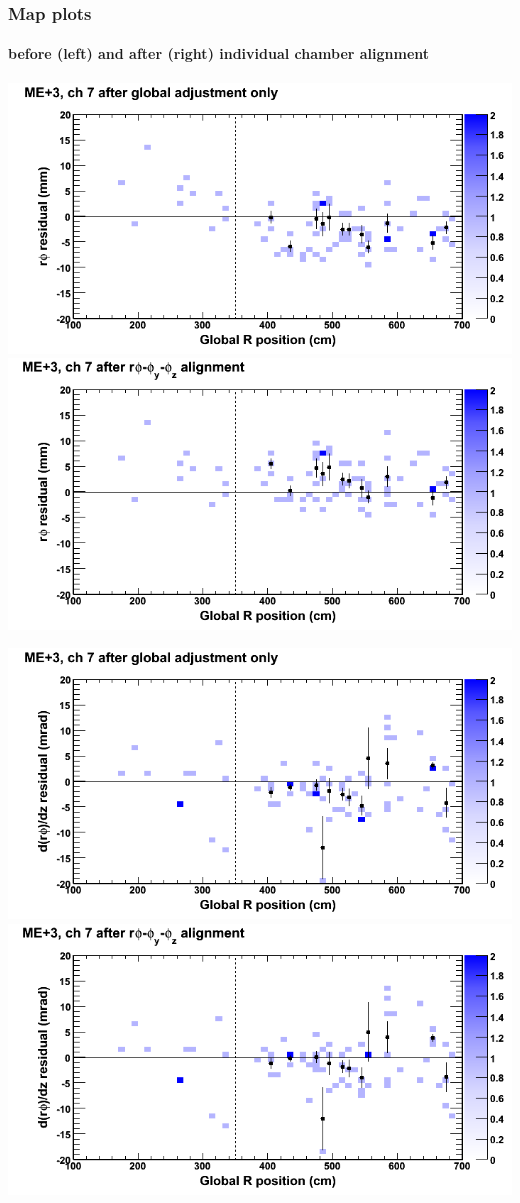 \documentclass[compress]{beamer}
\begin{document}
\begin{frame}
\frametitle{Map plots}
\framesubtitle{before (left) and after (right) individual chamber alignment}
\includegraphics[width=0.5\linewidth]{ringmapplots_3dof/before_CSCvsr_mep3ch07_x.png} \includegraphics[width=0.5\linewidth]{ringmapplots_3dof/after_CSCvsr_mep3ch07_x.png}

\includegraphics[width=0.5\linewidth]{ringmapplots_3dof/before_CSCvsr_mep3ch07_dxdz.png} \includegraphics[width=0.5\linewidth]{ringmapplots_3dof/after_CSCvsr_mep3ch07_dxdz.png}
\end{frame}
\end{document}
